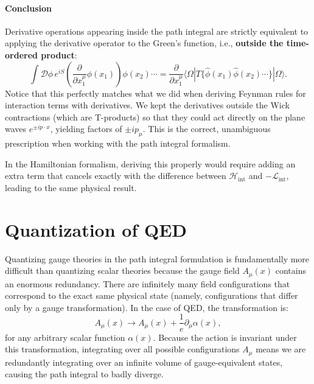 \paragraph{Conclusion}
Derivative operations appearing inside the path integral are strictly equivalent to applying the derivative operator to the Green's function, i.e., \textbf{outside the time-ordered product}:
\[
    \int \mathcal{D}\phi \, e^{iS} \left( \frac{\partial}{\partial x_1^\mu} \phi(x_1) \right) \phi(x_2) \cdots = \frac{\partial}{\partial x_1^\mu} \langle \Omega | T \{ \hat{\phi}(x_1) \hat{\phi}(x_2) \cdots \} | \Omega \rangle.
\]
Notice that this perfectly matches what we did when deriving Feynman rules for interaction terms with derivatives. We kept the derivatives outside the Wick contractions (which are T-products) so that they could act directly on the plane waves $e^{\pm i p \cdot x}$, yielding factors of $\pm i p_\mu$. This is the correct, unambiguous prescription when working with the path integral formalism.
\begin{remark}
    In the Hamiltonian formalism, deriving this properly would require adding an extra term that cancels exactly with the difference between $\mathcal{H}_{\text{int}}$ and $-\mathcal{L}_{\text{int}}$, leading to the same physical result.
\end{remark}

\section{Quantization of QED} 

Quantizing gauge theories in the path integral formulation is fundamentally more difficult than quantizing scalar theories because the gauge field $A_\mu(x)$ contains an enormous redundancy. There are infinitely many field configurations that correspond to the exact same physical state (namely, configurations that differ only by a gauge transformation). In the case of QED, the transformation is:
\[
    A_\mu(x) \to A_\mu(x) + \frac{1}{e} \partial_\mu \alpha(x),
\]
for any arbitrary scalar function $\alpha(x)$. Because the action is invariant under this transformation, integrating over all possible configurations $A_\mu$ means we are redundantly integrating over an infinite volume of gauge-equivalent states, causing the path integral to badly diverge.

